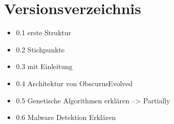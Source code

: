 \section{Versionsverzeichnis}

\begin{itemize}
    \item  0.1 erste Struktur
    \item 0.2 Stichpunkte
    \item 0.3 mit Einleitung
    \item 0.4 Architektur von ObscurusEvolved
    \item 0.5 Genetische Algorithmen erklären --> Partially
    \item 0.6 Malware Detektion Erklären
\end{itemize}

